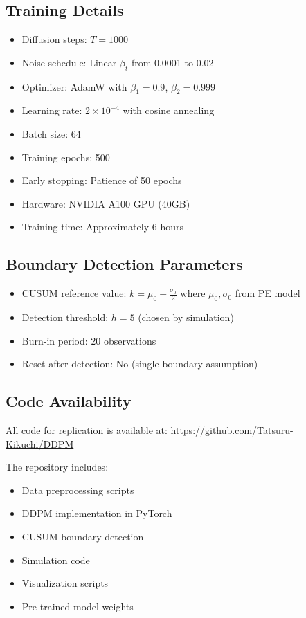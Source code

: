\subsection{Training Details}

\begin{itemize}
   \item Diffusion steps: $T = 1000$
   \item Noise schedule: Linear $\beta_t$ from 0.0001 to 0.02
   \item Optimizer: AdamW with $\beta_1 = 0.9$, $\beta_2 = 0.999$
   \item Learning rate: $2 \times 10^{-4}$ with cosine annealing
   \item Batch size: 64
   \item Training epochs: 500
   \item Early stopping: Patience of 50 epochs
   \item Hardware: NVIDIA A100 GPU (40GB)
   \item Training time: Approximately 6 hours
\end{itemize}

\subsection{Boundary Detection Parameters}

\begin{itemize}
   \item CUSUM reference value: $k = \mu_0 + \frac{\sigma_0}{2}$ where $\mu_0, \sigma_0$ from PE model
   \item Detection threshold: $h = 5$ (chosen by simulation)
   \item Burn-in period: 20 observations
   \item Reset after detection: No (single boundary assumption)
\end{itemize}

\subsection{Code Availability}

All code for replication is available at: \url{https://github.com/Tatsuru-Kikuchi/DDPM}

The repository includes:
\begin{itemize}
   \item Data preprocessing scripts
   \item DDPM implementation in PyTorch
   \item CUSUM boundary detection
   \item Simulation code
   \item Visualization scripts
   \item Pre-trained model weights
\end{itemize}

